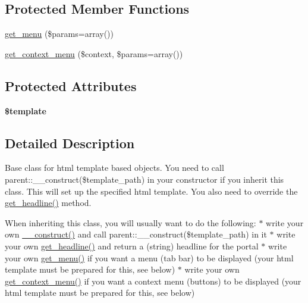 \subsection*{Protected Member Functions}
\begin{DoxyCompactItemize}
\item 
\hyperlink{classkoala__html_a2cb528d682a53d70fe407cee50adf689}{get\_\-menu} (\$params=array())
\item 
\hyperlink{classkoala__html_a82b9855f019ad724f321b4e04fae452a}{get\_\-context\_\-menu} (\$context, \$params=array())
\end{DoxyCompactItemize}
\subsection*{Protected Attributes}
\begin{DoxyCompactItemize}
\item 
\hypertarget{classkoala__html_a2cfbf26f3a35bfcad153bf25c38bbf88}{
{\bfseries \$template}}
\label{classkoala__html_a2cfbf26f3a35bfcad153bf25c38bbf88}

\end{DoxyCompactItemize}


\subsection{Detailed Description}
Base class for html template based objects. You need to call parent::\_\-\_\-construct(\$template\_\-path) in your constructor if you inherit this class. This will set up the specified html template. You also need to override the \hyperlink{classkoala__html_a12af0cd17308d30b95d38e14dd5e82ec}{get\_\-headline()} method.

When inheriting this class, you will usually want to do the following: $\ast$ write your own \hyperlink{classkoala__html_af9264b278c4e19335da3652abccc575f}{\_\-\_\-construct()} and call parent::\_\-\_\-construct(\$template\_\-path) in it $\ast$ write your own \hyperlink{classkoala__html_a12af0cd17308d30b95d38e14dd5e82ec}{get\_\-headline()} and return a (string) headline for the portal $\ast$ write your own \hyperlink{classkoala__html_a2cb528d682a53d70fe407cee50adf689}{get\_\-menu()} if you want a menu (tab bar) to be displayed (your html template must be prepared for this, see below) $\ast$ write your own \hyperlink{classkoala__html_a82b9855f019ad724f321b4e04fae452a}{get\_\-context\_\-menu()} if you want a context menu (buttons) to be displayed (your html template must be prepared for this, see below)

